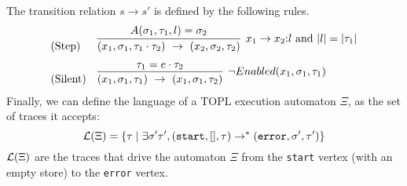 \documentclass{llncs} %
\begin{document}
%
The transition relation $s \to s'$ is defined by the following rules.
\[
\begin{array}{ll}
\text{(Step)}  &
\infer[x_1 \to x_2{:} l \mbox{ and } |l|=|\tau_1| ]{ (x_1,\sigma_1,\tau_1 \cdot \tau_2 ) \  \to \  (x_2, \sigma_2, \tau_2)}{A(\sigma_1,\tau_1,l)=\sigma_2}
\\[2ex]
\text{(Silent)}  & 
\infer[\neg Enabled(x_1,\sigma_1,\tau_1) ]{ (x_1,\sigma_1,\tau_1) \  \to \  (x_1, \sigma_1, \tau_2)}{ \tau_1=e \cdot \tau_2}
\end{array}
\]
Finally, we can define the language of a TOPL execution automaton $\Xi$, as the set of traces it accepts:
\[
{\cal L}(\Xi) = \{ \tau \mid \exists \sigma' \tau', (\mathtt{start},[],\tau) \to^* (\mathtt{error},\sigma',\tau')\}
\]
${\cal L}(\Xi)$ are the traces that drive the automaton $\Xi$ from the \texttt{start} vertex (with an empty store) to the \texttt{error} vertex.
\end{document}
